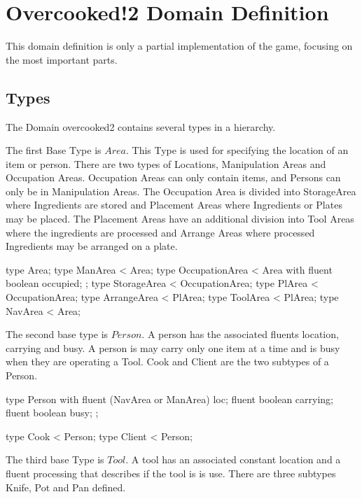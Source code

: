 %
\appendix

\section{Overcooked!2 Domain Definition}
\label{app:domain}

This domain definition is only a partial implementation of the game, focusing on the most important parts.


\subsection{Types}
The Domain overcooked2 contains several types in a hierarchy.

The first Base Type is $Area$.
This Type is used for specifying the location of an item or person. There are two types of Locations, Manipulation Areas and Occupation Areas.
Occupation Areas can only contain items, and Persons can only be in Manipulation Areas.
The Occupation Area is divided into StorageArea where Ingredients are stored and Placement Areas where Ingredients or Plates may be placed.
The Placement Areas have an additional division into Tool Areas where the ingredients are processed and Arrange Areas where processed Ingredients may be arranged on a plate.

\begin{anmlcode}
type Area;
type ManArea < Area;
type OccupationArea < Area with {
  fluent boolean occupied;
};
type StorageArea < OccupationArea;
type PlArea < OccupationArea;
type ArrangeArea < PlArea;
type ToolArea < PlArea;
type NavArea < Area;
\end{anmlcode}

The second base type is $Person$.
A person has the associated fluents location, carrying and busy.
A person is may carry only one item at a time and is busy when they are operating a Tool.
Cook and Client are the two subtypes of a Person.

\begin{anmlcode}
type Person with {
  fluent (NavArea or ManArea) loc;
  fluent boolean carrying;
  fluent boolean busy;
};

type Cook < Person;
type Client < Person;
\end{anmlcode}

The third base Type is $Tool$. A tool has an associated constant location and a fluent processing that describes if the tool is is use.
There are three subtypes Knife, Pot and Pan defined.

